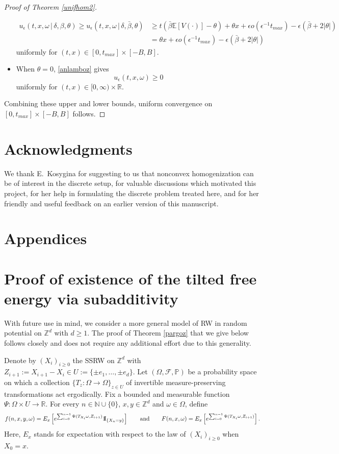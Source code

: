 \documentclass[a4paper]{amsart}
\numberwithin{equation}{section}
\theoremstyle{plain}
\theoremstyle{remark}
\begin{document}
\begin{proof}[Proof of Theorem \ref{unifhom2}]
\begin{itemize}
\begin{align*}
    u_{\epsilon}(t,x,\omega\,|\,\delta,\beta,\theta) \ge u_{\epsilon}(t,x,\omega\,|\,\delta,\bar\beta,\theta) &\ge t(\bar\beta\mathbb{E}[V(\cdot)] - \theta) + \theta x + {\epsilon} o({\epsilon^{-1}} t_{max}) - {\epsilon}(\bar\beta + 2|\theta|)\\
    &= \theta x + {\epsilon} o({\epsilon^{-1}} t_{max}) - {\epsilon}(\bar\beta + 2|\theta|)
    \end{align*}
    uniformly for $(t,x)\in[0,t_{max}]\times[-B,B]$.
    \item When $\theta = 0$, \eqref{anlamboz} gives
    $$u_{\epsilon}(t,x,\omega)\ge 0$$
    uniformly for $(t,x)\in[0,\infty)\times\mathbb{R}$.
\end{itemize}
Combining these upper and lower bounds, uniform convergence on $[0,t_{max}]\times[-B,B]$ follows.
\end{proof}

\section*{Acknowledgments}
We thank E.\ Kosygina for suggesting to us that nonconvex homogenization can be of interest in the discrete setup,
for valuable discussions which motivated this project,
for her help in formulating the discrete problem treated here,
and for her friendly and useful feedback on an earlier version of this manuscript.

\section*{Appendices}

\appendices

\section{Proof of existence of the tilted free energy via subadditivity}\label{app_subadd}

With future use in mind, we consider a more general model of RW in random potential on $\mathbb{Z}^d$ with $d\ge1$. The proof of Theorem \ref{pargoz} that we give below follows \cite[Section 2]{Var2003} closely and does not require any additional effort due to this generality.

Denote by $(X_i)_{i\ge0}$ the SSRW on $\mathbb{Z}^d$ with $Z_{i+1} := X_{i+1} - X_i\in U := \{\pm e_1,\ldots,\pm e_d\}$. Let $(\Omega,\mathcal{F},\mathbb{P})$ be a probability space on which a collection $\{T_z: \Omega\to\Omega\}_{z\in U}$ of invertible measure-preserving transformations act ergodically. Fix a bounded and measurable function $\Psi:\Omega\times U\to\mathbb{R}$. For every $n\in\mathbb{N}\cup\{0\}$, $x,y\in\mathbb{Z}^d$ and $\omega\in\Omega$, define
$$f(n,x,y,\omega) = E_x\left[e^{\sum_{i=0}^{n-1}\Psi(T_{X_i}\omega,Z_{i+1})}{{{\rm 1\mkern-1.5mu}\!{\rm I}}}_{\{X_n = y\}}\right]\qquad\text{and}\qquad F(n,x,\omega) = E_x\left[e^{\sum_{i=0}^{n-1}\Psi(T_{X_i}\omega,Z_{i+1})}\right].$$
Here, $E_x$ stands for expectation with respect to the law of $(X_i)_{i\ge0}$ when $X_0 = x$.
\end{document}
